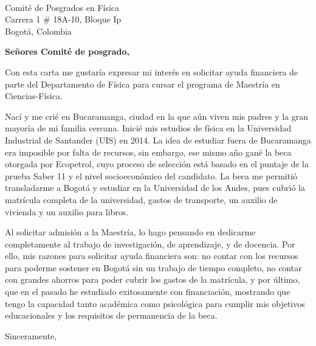 \documentclass[10pt]{letter} %
\begin{document}

\begin{letter}{\\ Comité de Posgrados en Física \\ Carrera 1 \# 18A-10, Bloque Ip \\ Bogotá, Colombia} %


\opening{\textbf{Señores Comité de posgrado,}}
Con esta carta me gustaría expresar mi interés en solicitar ayuda financiera de parte del Departamento de Física para cursar el programa de Maestría en Ciencias-Física.


Nací y me crié en Bucaramanga, ciudad en la que aún viven mis padres y la gran mayoría de mi familia cercana.  Inicié mis estudios de física en la Universidad Industrial de Santander (UIS) en 2014. La idea de estudiar fuera de Bucaramanga era imposible por falta de recursos, sin embargo, ese mismo año gané la beca  otorgada por Ecopetrol, cuyo proceso de selección está basado en el puntaje de la prueba Saber 11 y el nivel socioeconómico del candidato. La beca me permitió transladarme a Bogotá y estudiar en la Universidad de los Andes, pues cubrió la matrícula completa de la universidad, gastos de transporte, un auxilio de vivienda y un auxilio para libros.

Al solicitar admisión a la Maestría, lo hago pensando en dedicarme completamente al trabajo de  investigación, de aprendizaje, y de docencia. Por ello, mis razones para solicitar ayuda financiera son: no contar con los recursos para poderme sostener en Bogotá sin un trabajo de tiempo completo, no contar con grandes ahorros para poder cubrir los gastos de la matrícula, y por último, que en el pasado he estudiado exitosamente con financiación, mostrando que tengo la capacidad tanto académica como psicológica para cumplir mis objetivos educacionales y los requisitos de permanencia de la beca.


\vspace{2\parskip} %
\closing{Sinceramente,}
\vspace{2\parskip} %



\end{letter}
 
\end{document}
